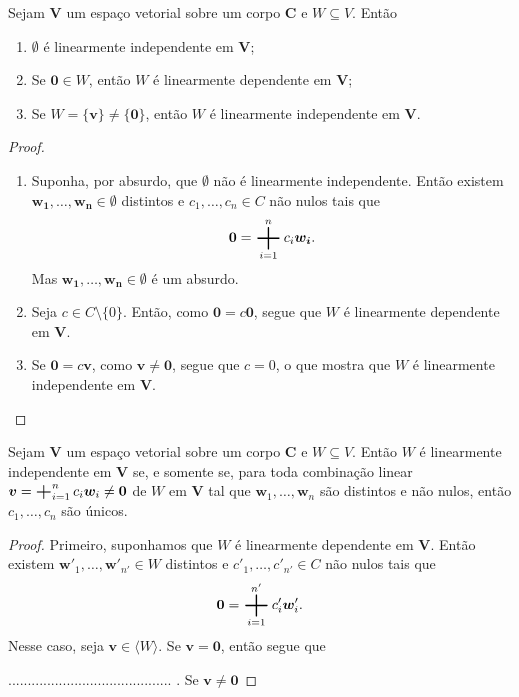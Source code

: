 \begin{prop}
	Sejam $\bm V$ um espaço vetorial sobre um corpo $\bm C$ e $W \subseteq V$. Então
	\begin{enumerate}
	\item $\emptyset$ é linearmente independente em $\bm V$;
	\item Se $\bm 0 \in W$, então $W$ é linearmente dependente em $\bm V$;
	\item Se $W=\{\bm v\}\neq\{\bm 0\}$, então $W$ é linearmente independente em $\bm V$.
	\end{enumerate}
\end{prop}
\begin{proof}
	\begin{enumerate}
	\item Suponha, por absurdo, que $\emptyset$ não é linearmente independente. Então existem $\bm{w_1},\ldots,\bm{w_n} \in \emptyset$ distintos e $c_1,\ldots,c_n \in C$ não nulos tais que
	\begin{equation*}
	\bm 0 = \bigplus_{i=1}^n c_i\bm{w_i}.
	\end{equation*}
Mas $\bm{w_1},\ldots,\bm{w_n} \in \emptyset$ é um absurdo.
	\item Seja $c \in C \setminus \{0\}$. Então, como $\bm 0 = c \bm 0$, segue que $W$ é linearmente dependente em $\bm V$.
	\item Se $\bm 0 = c\bm v$, como $\bm v \neq \bm 0$, segue que $c=0$, o que mostra que $W$ é linearmente independente em $\bm V$.
	\qedhere
	\end{enumerate}
\end{proof}

\begin{prop}
	Sejam $\bm V$ um espaço vetorial sobre um corpo $\bm C$ e $W \subseteq V$. Então $W$ é linearmente independente em $\bm V$ se, e somente se, para toda combinação linear $\bm v = \bigplus_{i=1}^n c_i\bm w_i \neq \bm 0$ de $W$ em $\bm V$ tal que $\bm w_1,\ldots,\bm w_n$ são distintos e não nulos, então $c_1,\ldots,c_n$ são únicos.
\end{prop}
\begin{proof}
	Primeiro, suponhamos que $W$ é linearmente dependente em $\bm V$. Então existem $\bm w'_1, \ldots,\bm w'_{n'} \in W$ distintos e $c'_1,\ldots,c'_{n'} \in C$ não nulos tais que
	\begin{equation*}
	\bm 0 = \bigplus_{i=1}^{n'} c'_i\bm w'_i.
	\end{equation*}
Nesse caso, seja $\bm v \in \langle W \rangle$. Se $\bm v = \bm 0$, então segue que









 .......................................... . Se $\bm v \neq \bm 0$










\end{proof}

